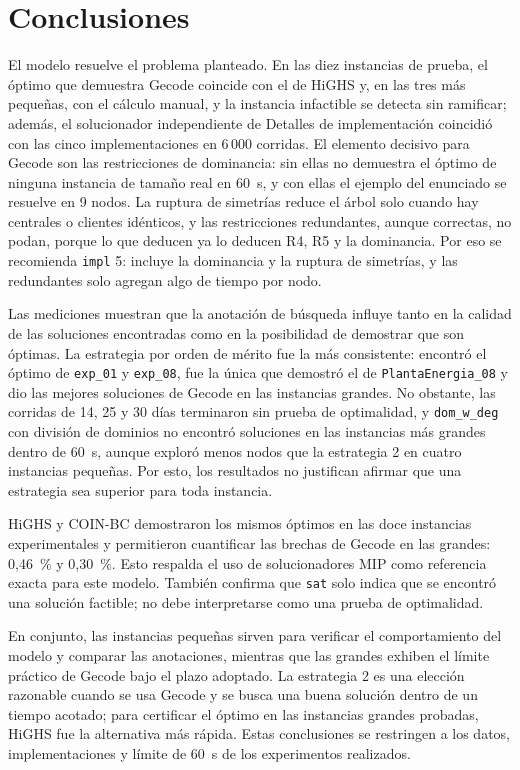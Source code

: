 \section{Conclusiones}

El modelo resuelve el problema planteado. En las diez instancias de prueba, el óptimo que demuestra Gecode coincide con el de HiGHS y, en las tres más pequeñas, con el cálculo manual, y la instancia infactible se detecta sin ramificar; además, el solucionador independiente de Detalles de implementación coincidió con las cinco implementaciones en 6\,000 corridas. El elemento decisivo para Gecode son las restricciones de dominancia: sin ellas no demuestra el óptimo de ninguna instancia de tamaño real en 60~s, y con ellas el ejemplo del enunciado se resuelve en 9 nodos. La ruptura de simetrías reduce el árbol solo cuando hay centrales o clientes idénticos, y las restricciones redundantes, aunque correctas, no podan, porque lo que deducen ya lo deducen R4, R5 y la dominancia. Por eso se recomienda \texttt{impl} 5: incluye la dominancia y la ruptura de simetrías, y las redundantes solo agregan algo de tiempo por nodo.

Las mediciones muestran que la anotación de búsqueda influye tanto en la calidad de las soluciones encontradas como en la posibilidad de demostrar que son óptimas. La estrategia por orden de mérito fue la más consistente: encontró el óptimo de \texttt{exp\_01} y \texttt{exp\_08}, fue la única que demostró el de \texttt{PlantaEnergia\_08} y dio las mejores soluciones de Gecode en las instancias grandes. No obstante, las corridas de 14, 25 y 30 días terminaron sin prueba de optimalidad, y \texttt{dom\_w\_deg} con división de dominios no encontró soluciones en las instancias más grandes dentro de 60~s, aunque exploró menos nodos que la estrategia 2 en cuatro instancias pequeñas. Por esto, los resultados no justifican afirmar que una estrategia sea superior para toda instancia.

HiGHS y COIN-BC demostraron los mismos óptimos en las doce instancias experimentales y permitieron cuantificar las brechas de Gecode en las grandes: 0,46~\% y 0,30~\%. Esto respalda el uso de solucionadores MIP como referencia exacta para este modelo. También confirma que \texttt{sat} solo indica que se encontró una solución factible; no debe interpretarse como una prueba de optimalidad.

En conjunto, las instancias pequeñas sirven para verificar el comportamiento del modelo y comparar las anotaciones, mientras que las grandes exhiben el límite práctico de Gecode bajo el plazo adoptado. La estrategia 2 es una elección razonable cuando se usa Gecode y se busca una buena solución dentro de un tiempo acotado; para certificar el óptimo en las instancias grandes probadas, HiGHS fue la alternativa más rápida. Estas conclusiones se restringen a los datos, implementaciones y límite de 60~s de los experimentos realizados.
